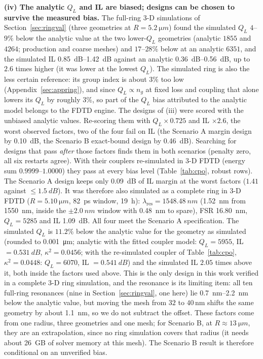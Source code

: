 \documentclass[11pt]{article}
\newcommand{\lres}{\lambda_{\mathrm{res}}}
\newcommand{\QL}{Q_L}
\begin{document}
\textbf{(iv) The analytic $\QL$ and IL are biased; designs can be chosen to survive the measured bias.} The full-ring 3-D simulations of Section~\ref{sec:ringval} (three geometries at $R = \SI{5.2}{\micro m}$) found the simulated $\QL$ $4$--$9\%$ below the analytic value at the two lower-$\QL$ geometries (analytic $1855$ and $4264$; production and coarse meshes) and $17$--$28\%$ below at an analytic $6351$, and the simulated IL \SIrange{0.85}{1.42}{dB} against an analytic \SIrange{0.36}{0.56}{dB}, up to $2.6$ times higher (it was lower at the lowest $\QL$). The simulated ring is also the less certain reference: its group index is about $3\%$ too low (Appendix~\ref{sec:appring}), and since $\QL \propto n_g$ at fixed loss and coupling that alone lowers its $\QL$ by roughly $3\%$, so part of the $\QL$ bias attributed to the analytic model belongs to the FDTD engine. The designs of (iii) were scored with the unbiased analytic values. Re-scoring them with $\QL \times 0.725$ and IL $\times 2.6$, the worst observed factors, two of the four fail on IL (the Scenario A margin design by \SI{0.10}{dB}, the Scenario B exact-bound design by \SI{0.46}{dB}). Searching for designs that pass \emph{after} those factors finds them in both scenarios (penalty zero, all six restarts agree). With their couplers re-simulated in 3-D FDTD (energy sum $0.9999$--$1.0000$) they pass at every bias level (Table~\ref{tab:cpo}, robust rows). The Scenario A design keeps only \SI{0.09}{dB} of IL margin at the worst factors ($1.41$ against $\le \SI{1.5}{dB}$). It was therefore also simulated as a complete ring in 3-D FDTD ($R = \SI{5.10}{\micro m}$, \SI{82}{ps} window, \SI{19}{h}): $\lres = \SI{1548.48}{nm}$ (\SI{1.52}{nm} from \SI{1550}{nm}, inside the $\pm\SI{2.0}{nm}$ window with \SI{0.48}{nm} to spare), FSR \SI{16.80}{nm}, $\QL = 5285$ and IL \SI{1.09}{dB}. All four meet the Scenario A specification. The simulated $\QL$ is $11.2\%$ below the analytic value for the geometry as simulated (rounded to \SI{0.001}{\micro m}; analytic with the fitted coupler model: $\QL = 5955$, IL $= \SI{0.531}{dB}$, $\kappa^2 = 0.0456$; with the re-simulated coupler of Table~\ref{tab:cpo}, $\kappa^2 = 0.0448$: $\QL = 6070$, IL $= \SI{0.541}{dB}$) and the simulated IL $2.05$ times above it, both inside the factors used above. This is the only design in this work verified in a complete 3-D ring simulation, and the resonance is its limiting item: all ten full-ring resonances (nine in Section~\ref{sec:ringval}, one here) lie \SIrange{0.7}{2.2}{nm} below the analytic value, but moving the mesh from $32$ to $40$\,nm shifts the same geometry by about \SI{1.1}{nm}, so we do not subtract the offset. These factors come from one radius, three geometries and one mesh; for Scenario B, at $R \approx \SI{13}{\micro m}$, they are an extrapolation, since no ring simulation covers that radius (it needs about \SI{26}{GB} of solver memory at this mesh). The Scenario B result is therefore conditional on an unverified bias.
\end{document}
